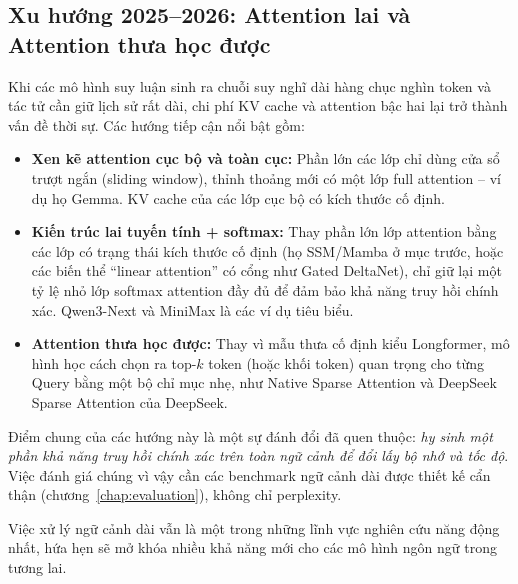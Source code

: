 \subsection{Xu hướng 2025--2026: Attention lai và Attention thưa học được \newtag}
\label{ssec:hybrid_attention_trends}
Khi các mô hình suy luận sinh ra chuỗi suy nghĩ dài hàng chục nghìn token và tác tử cần giữ lịch sử rất dài, chi phí KV cache và attention bậc hai lại trở thành vấn đề thời sự. Các hướng tiếp cận nổi bật gồm:
\begin{itemize}
	\item \textbf{Xen kẽ attention cục bộ và toàn cục:} Phần lớn các lớp chỉ dùng cửa sổ trượt ngắn (sliding window), thỉnh thoảng mới có một lớp full attention -- ví dụ họ Gemma. KV cache của các lớp cục bộ có kích thước cố định.
	\item \textbf{Kiến trúc lai tuyến tính + softmax:} Thay phần lớn lớp attention bằng các lớp có trạng thái kích thước cố định (họ SSM/Mamba ở mục trước, hoặc các biến thể “linear attention” có cổng như Gated DeltaNet), chỉ giữ lại một tỷ lệ nhỏ lớp softmax attention đầy đủ để đảm bảo khả năng truy hồi chính xác. Qwen3-Next và MiniMax là các ví dụ tiêu biểu.
	\item \textbf{Attention thưa học được:} Thay vì mẫu thưa cố định kiểu Longformer, mô hình học cách chọn ra top-$k$ token (hoặc khối token) quan trọng cho từng Query bằng một bộ chỉ mục nhẹ, như Native Sparse Attention và DeepSeek Sparse Attention của DeepSeek.
\end{itemize}
Điểm chung của các hướng này là một sự đánh đổi đã quen thuộc: \emph{hy sinh một phần khả năng truy hồi chính xác trên toàn ngữ cảnh để đổi lấy bộ nhớ và tốc độ}. Việc đánh giá chúng vì vậy cần các benchmark ngữ cảnh dài được thiết kế cẩn thận (chương~\ref{chap:evaluation}), không chỉ perplexity.

Việc xử lý ngữ cảnh dài vẫn là một trong những lĩnh vực nghiên cứu năng động nhất, hứa hẹn sẽ mở khóa nhiều khả năng mới cho các mô hình ngôn ngữ trong tương lai.